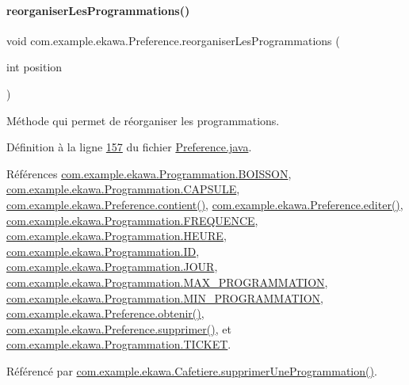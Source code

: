 \paragraph{\texorpdfstring{reorganiser\+Les\+Programmations()}{reorganiserLesProgrammations()}}
{\footnotesize\ttfamily void com.\+example.\+ekawa.\+Preference.\+reorganiser\+Les\+Programmations (\begin{DoxyParamCaption}\item[{int}]{position }\end{DoxyParamCaption})}



Méthode qui permet de réorganiser les programmations. 



Définition à la ligne \hyperlink{_preference_8java_source_l00157}{157} du fichier \hyperlink{_preference_8java_source}{Preference.\+java}.



Références \hyperlink{_programmation_8java_source_l00027}{com.\+example.\+ekawa.\+Programmation.\+B\+O\+I\+S\+S\+ON}, \hyperlink{_programmation_8java_source_l00026}{com.\+example.\+ekawa.\+Programmation.\+C\+A\+P\+S\+U\+LE}, \hyperlink{_preference_8java_source_l00087}{com.\+example.\+ekawa.\+Preference.\+contient()}, \hyperlink{_preference_8java_source_l00100}{com.\+example.\+ekawa.\+Preference.\+editer()}, \hyperlink{_programmation_8java_source_l00030}{com.\+example.\+ekawa.\+Programmation.\+F\+R\+E\+Q\+U\+E\+N\+CE}, \hyperlink{_programmation_8java_source_l00029}{com.\+example.\+ekawa.\+Programmation.\+H\+E\+U\+RE}, \hyperlink{_programmation_8java_source_l00025}{com.\+example.\+ekawa.\+Programmation.\+ID}, \hyperlink{_programmation_8java_source_l00028}{com.\+example.\+ekawa.\+Programmation.\+J\+O\+UR}, \hyperlink{_programmation_8java_source_l00023}{com.\+example.\+ekawa.\+Programmation.\+M\+A\+X\+\_\+\+P\+R\+O\+G\+R\+A\+M\+M\+A\+T\+I\+ON}, \hyperlink{_programmation_8java_source_l00022}{com.\+example.\+ekawa.\+Programmation.\+M\+I\+N\+\_\+\+P\+R\+O\+G\+R\+A\+M\+M\+A\+T\+I\+ON}, \hyperlink{_preference_8java_source_l00052}{com.\+example.\+ekawa.\+Preference.\+obtenir()}, \hyperlink{_preference_8java_source_l00132}{com.\+example.\+ekawa.\+Preference.\+supprimer()}, et \hyperlink{_programmation_8java_source_l00031}{com.\+example.\+ekawa.\+Programmation.\+T\+I\+C\+K\+ET}.



Référencé par \hyperlink{_cafetiere_8java_source_l00820}{com.\+example.\+ekawa.\+Cafetiere.\+supprimer\+Une\+Programmation()}.


